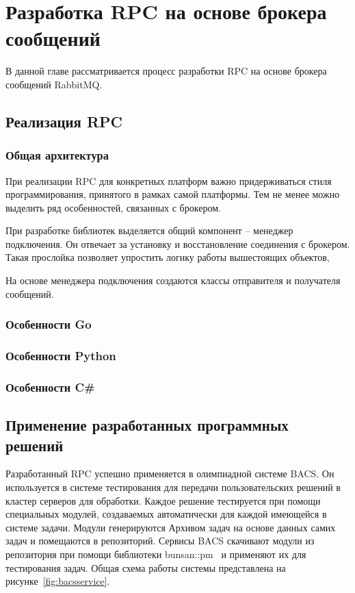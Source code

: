\chapter{Разработка RPC на основе брокера сообщений}
В данной главе рассматривается процесс разработки RPC на основе
брокера сообщений RabbitMQ.

\section{Реализация RPC}


\subsection{Общая архитектура}
При реализации RPC для конкретных платформ важно придерживаться стиля
программирования, принятого в рамках самой платформы. Тем не менее
можно выделить ряд особенностей, связанных с брокером.

При разработке библиотек выделяется общий компонент -- менеджер подключения.
Он отвечает за установку и восстановление соединения с брокером.
Такая прослойка позволяет упростить логику работы вышестоящих объектов,

На основе менеджера подключения создаются классы отправителя и получателя
сообщений.

\subsection{Особенности Go}
\subsection{Особенности Python}
\subsection{Особенности C\#}

\section{Применение разработанных программных решений}
Разработанный RPC успешно применяется в олимпиадной системе BACS.
Он используется в системе тестирования для передачи пользовательских
решений в кластер серверов для обработки. Каждое решение тестируется
при помощи специальных модулей, создаваемых автоматически
для каждой имеющейся в системе задачи. Модули генерируются Архивом задач
на основе данных самих задач и помещаются в репозиторий. Сервисы BACS
скачивают модули из репозитория при помощи библиотеки bunsan::pm~\cite{bunsanpm}
и применяют их для тестирования задач. Общая схема работы системы
представлена на рисунке~\ref{fig:bacsservice}.


